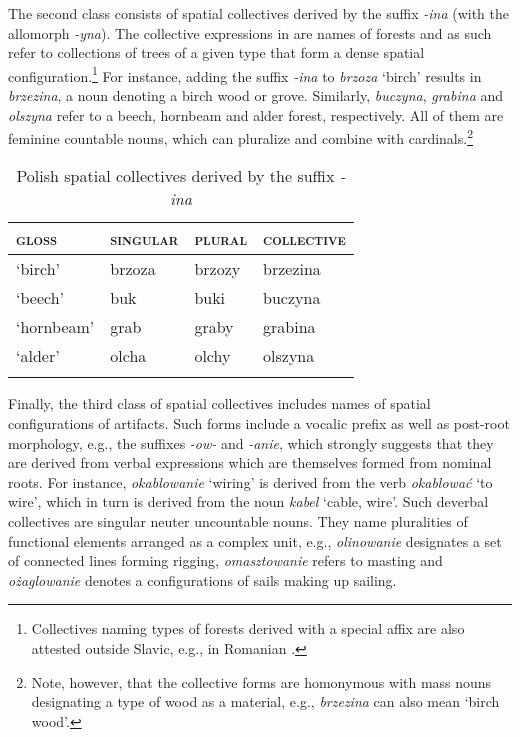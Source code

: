 \documentclass[output=paper]{langscibook}
\begin{document}
{ The second class consists of spatial collectives derived by the suffix \textit{-ina} (with the allomorph \textit{-yna}). The collective expressions in  are names of forests and as such refer to collections of trees of a given type that form a dense spatial configuration.\footnote{Collectives naming types of forests derived with a special affix are also attested outside Slavic, e.g., in Romanian \citep{henderson2017swarms}.} For instance, adding the suffix \textit{-ina} to \textit{brzoza} `birch' results in \textit{brzezina}, a noun denoting a birch wood or grove. Similarly, \textit{buczyna}, \textit{grabina} and \textit{olszyna} refer to a beech, hornbeam and alder forest, respectively. All of them are feminine countable nouns, which can pluralize and combine with cardinals.\footnote{Note, however, that the collective forms are homonymous with mass nouns designating a type of wood as a material, e.g., \textit{brzezina} can also mean `birch wood'.}}

\begin{table}[h!]
\caption{Polish spatial collectives derived by the suffix \textit{-ina}} 
\label{wan:tab:brzezina}
 \begin{tabular}{llll} 
  \lsptoprule
          \textsc{gloss}  & \textsc{singular} & \textsc{plural} & \textsc{collective} \\ 
  \midrule
  `birch'  &   brzoza &    brzozy  &    brzezina \\
  `beech'  &   buk &   buki &    buczyna \\
  `hornbeam'  &   grab &   graby &    grabina \\
  `alder'  &   olcha &   olchy &    olszyna \\
  \lspbottomrule
 \end{tabular}
\end{table}

Finally, the third class of spatial collectives includes names of spatial configurations of artifacts.  Such forms include a vocalic prefix as well as post-root morphology, e.g., the suffixes \textit{-ow-} and \textit{-anie}, which strongly suggests that they are derived from verbal expressions which are themselves formed from nominal roots. For instance, \textit{okablowanie} `wiring' is derived from the verb \textit{okablować} `to wire', which in turn is derived from the noun \textit{kabel} `cable, wire'. Such deverbal collectives are singular neuter uncountable nouns. They name pluralities of functional elements arranged as a complex unit, e.g., \textit{olinowanie} designates a set of connected lines forming rigging, \textit{omasztowanie} refers to masting and \textit{ożaglowanie} denotes a configurations of sails making up sailing. 
\end{document}

